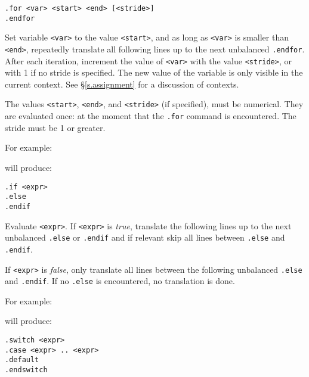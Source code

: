 \begin{verbatim}
.for <var> <start> <end> [<stride>]
.endfor
\end{verbatim}
\begin{desc}
Set variable \texttt{<var>} to the value \texttt{<start>}, and as
long as \texttt{<var>} is smaller than \texttt{<end>}, repeatedly
translate all following lines up to the next unbalanced \texttt{.endfor}.
After each iteration, increment the value of \texttt{<var>} with
the value \texttt{<stride>}, or with 1 if no stride is specified.
The new value of the variable is only visible in the current context.
See \S\ref{s.assignment} for a discussion of contexts.

The values \texttt{<start>}, \texttt{<end>}, and \texttt{<stride>}
(if specified), must be numerical.  They are evaluated once: at the
moment that the \texttt{.for} command is encountered.  The stride
must be 1 or greater.

For example:
\begin{showfile}

\end{showfile}
will produce:
\begin{showfile}

\end{showfile}
\end{desc}
\begin{verbatim}
.if <expr>
.else
.endif
\end{verbatim}
\begin{desc}
Evaluate \texttt{<expr>}.
If \texttt{<expr>} is \textit{true},
translate the following lines up to the next unbalanced
\texttt{.else} or \texttt{.endif}
and if relevant skip all lines between \texttt{.else} and \texttt{.endif}.

If \texttt{<expr>} is \textit{false},
only translate all lines between the following unbalanced
\texttt{.else} and \texttt{.endif}.
If no \texttt{.else} is encountered, no translation is done.

For example:
\begin{showfile}

\end{showfile}
will produce:
\begin{showfile}

\end{showfile}
\end{desc}
\begin{verbatim}
.switch <expr>
.case <expr> .. <expr>
.default
.endswitch
\end{verbatim}
